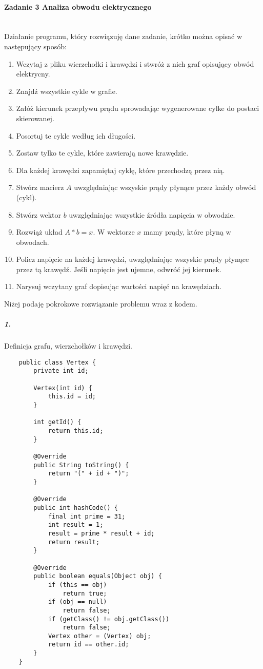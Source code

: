 \documentclass[12pt,a4paper]{article}
\begin{document}
\paragraph{Zadanie 3 Analiza obwodu elektrycznego}\mbox{}\vspace{3mm}\\
Działanie programu, który rozwiązuję dane zadanie, krótko można opisać w
następujący sposób:
\begin{enumerate}
    \item Wczytaj z pliku wierzchołki i krawędzi i stwróż z nich graf opisujący
    obwód elektrycny.
    \item Znajdź wszystkie cykle w grafie.
    \item Załóż kierunek przepływu prądu sprowadając wygenerowane cylke do
    postaci skierowanej.
    \item Posortuj te cykle według ich długości.
    \item Zostaw tylko te cykle, które zawierają nowe krawędzie.
    \item Dla każdej krawędzi zapamiętaj cyklę, które przechodzą przez nią.
    \item Stwórz macierz $A$ uwzględniając wszyskie prądy płynące przez każdy
    obwód (cykl).
    \item Stwórz wektor $b$ uwzględniając wszystkie źródła napięcia w obwodzie.
    \item Rozwiąż układ $A*b = x$. W wektorze $x$ mamy prądy, które płyną w obwodach.
    \item Policz napięcie na każdej krawędzi, uwzględniając wszyskie prądy
    płynące przez tą krawędź. Jeśli napięcie jest ujemne, odwróć jej kierunek.
    \item Narysuj wczytany graf dopisując wartości napięć na krawędziach.
\end{enumerate}
Niżej podaję pokrokowe rozwiązanie problemu wraz z kodem.
\subparagraph{1.} Definicja grafu, wierzchołków i krawędzi.
\begin{Verbatim}
    public class Vertex {
    	private int id;

    	Vertex(int id) {
    	    this.id = id;
        }

    	int getId() {
    	    return this.id;
        }

    	@Override
    	public String toString() {
    		return "(" + id + ")";
    	}

    	@Override
    	public int hashCode() {
    		final int prime = 31;
    		int result = 1;
    		result = prime * result + id;
    		return result;
    	}

    	@Override
    	public boolean equals(Object obj) {
    		if (this == obj)
    			return true;
    		if (obj == null)
    			return false;
    		if (getClass() != obj.getClass())
    			return false;
    		Vertex other = (Vertex) obj;
    		return id == other.id;
    	}
    }
\end{Verbatim}
\end{document}
